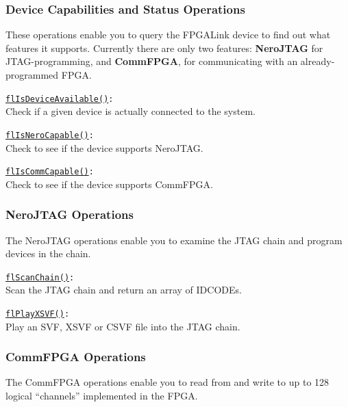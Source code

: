 \newpage
\subsubsection{Device Capabilities and Status Operations}
These operations enable you to query the FPGALink device to find out what features it supports. Currently there are only two features: \textbf{NeroJTAG} for JTAG-programming, and \textbf{CommFPGA}, for communicating with an already-programmed FPGA.

\begin{desc}
  \item[\texttt{\href{http://www.swaton.ukfsn.org/apidocs/libfpgalink\_8h.html\#a223dc9f94043ac92e744b5b3390a3f0c}{flIsDeviceAvailable()}:}] \hfill \\
    Check if a given device is actually connected to the system.
  \item[\texttt{\href{http://www.swaton.ukfsn.org/apidocs/libfpgalink\_8h.html\#a7af1b24a52d15edd73ad19a5e392abd2}{flIsNeroCapable()}:}] \hfill \\
    Check to see if the device supports NeroJTAG.
  \item[\texttt{\href{http://www.swaton.ukfsn.org/apidocs/libfpgalink\_8h.html\#ae9c77acac33d48758fb0bfdee0c7a8d8}{flIsCommCapable()}:}] \hfill \\
    Check to see if the device supports CommFPGA.
\end{desc}

\subsubsection{NeroJTAG Operations}
The NeroJTAG operations enable you to examine the JTAG chain and program devices in the chain.

\begin{desc}
  \item[\texttt{\href{http://www.swaton.ukfsn.org/apidocs/libfpgalink\_8h.html\#a32d14b999b8e9d0befde895d4272e4ef}{flScanChain()}:}] \hfill \\
    Scan the JTAG chain and return an array of IDCODEs.
  \item[\texttt{\href{http://www.swaton.ukfsn.org/apidocs/libfpgalink\_8h.html\#ab51ec323f4cc1d81dbf2ce32c53b3b37}{flPlayXSVF()}:}] \hfill \\
    Play an SVF, XSVF or CSVF file into the JTAG chain.
\end{desc}

\subsubsection{CommFPGA Operations}
The CommFPGA operations enable you to read from and write to up to 128 logical ``channels'' implemented in the FPGA.

